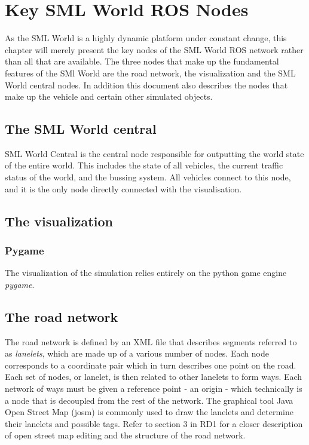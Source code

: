 \documentclass[11pt,a4paper]{book}
\begin{document}
\chapter{Key SML World ROS Nodes}
As the SML World is a highly dynamic platform under constant change, this chapter will merely present the key nodes of the SML World ROS network rather than all that are available. The three nodes that make up the fundamental features of the SMl World are the road network, the visualization and the SML World central nodes. In addition this document also describes the nodes that make up the vehicle and certain other simulated objects.

\section{The SML World central}
SML World Central is the central node responsible for outputting the world state of the entire world. This includes the state of all vehicles, the current traffic status of the world, and the bussing system. All vehicles connect to this node, and it is the only node directly connected with the visualisation.

\section{The visualization}
\subsection{Pygame}
The visualization of the simulation relies entirely on the python game engine \textit{pygame}.

\section{The road network}
\label{sec:road}
The road network is defined by an XML file that describes segments referred to as \textit{lanelets}, which are made up of a various number of nodes. Each node corresponds to a coordinate pair which in turn describes one point on the road. Each set of nodes, or lanelet, is then related to other lanelets to form ways. Each network of ways must be given a reference point - an origin - which technically is a node that is decoupled from the rest of the network. The graphical tool Java Open Street Map (josm) is commonly used to draw the lanelets and determine their lanelets and possible tags. Refer to section 3 in RD1 for a closer description of open street map editing and the structure of the road network. \\
\end{document}
